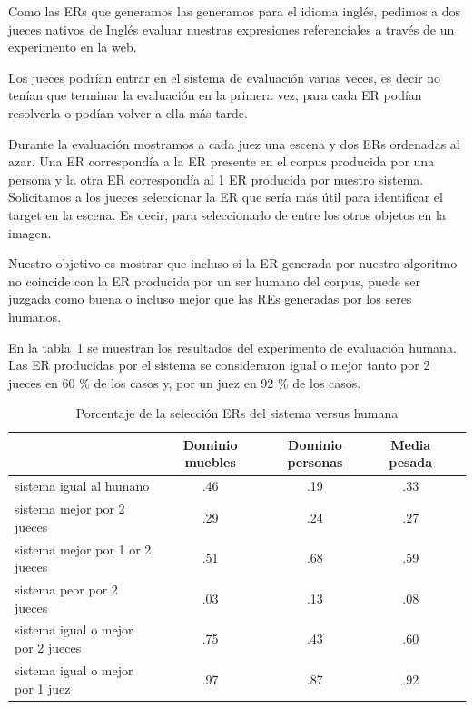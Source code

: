 Como las ERs que generamos las generamos para el idioma ingl\'es, pedimos a dos jueces nativos de Ingl\'es evaluar nuestras expresiones referenciales a trav\'es de un experimento en la web. 

Los jueces podr\'{i}an entrar en el sistema de evaluaci\'on varias veces, es decir no ten\'ian que terminar la evaluaci\'on en la primera vez, para cada ER pod\'ian resolverla o pod\'ian volver a ella m\'as tarde. 

Durante la evaluaci\'on mostramos a cada juez una escena y dos ERs ordenadas al azar. Una ER correspond\'ia a la ER presente en el corpus producida por una persona y la otra ER correspond\'ia al 1 ER producida por nuestro sistema. Solicitamos a los jueces seleccionar la ER que ser\'{i}a m\'as \'util para identificar el target en la escena. Es decir, para seleccionarlo de entre los otros objetos en la imagen.

Nuestro objetivo es mostrar que incluso si la ER generada por nuestro algoritmo no coincide con la ER producida por un ser humano del corpus, puede ser juzgada como buena o incluso mejor que las REs generadas por los seres humanos.

En la tabla~\ref{system-versus-human} se muestran los resultados del experimento de evaluaci\'on humana.
Las ER producidas por el sistema se consideraron igual o mejor tanto por 2
jueces en 60 \% de los casos y, por un juez en 92 \% de los casos.

\begin{table}[h!]
\begin{center}
\begin{tabular}{|l|c|c|c|c|}
\hline
 & Dominio muebles & Dominio personas & Media pesada \\
\hline
sistema igual al humano  	&	.46	&	.19	&	.33 \\
sistema mejor por 2 jueces &	.29 	& 	.24 	& 	.27 \\
sistema mejor por 1 or 2 jueces & .51	&	.68	&	.59 \\
sistema peor por 2 jueces &	.03	&	.13	&	.08 \\
sistema igual o mejor por 2 jueces  &.75  &       .43	&       .60 \\
sistema igual o mejor por 1 juez  &.97	&	.87	&	.92 \\
\hline
\end{tabular}
\caption{Porcentaje de la selecci\'on ERs del sistema versus humana} 
\label{system-versus-human}
\vspace*{-.5cm}
\end{center}
\end{table}

